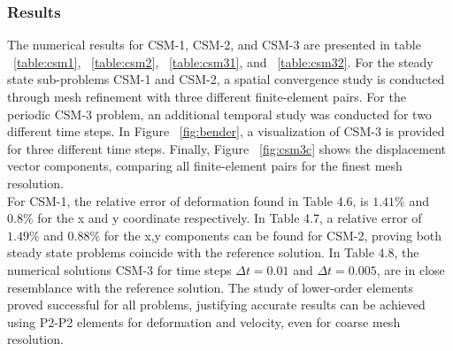 \subsubsection*{Results}
The numerical results for CSM-1, CSM-2, and CSM-3 are presented in table  ~\ref{table:csm1}, ~\ref{table:csm2}, ~\ref{table:csm31}, and ~\ref{table:csm32}. For the steady state sub-problems CSM-1 and CSM-2, a spatial convergence study is conducted through mesh refinement with three different finite-element pairs. For the periodic CSM-3 problem, an additional temporal study was conducted for two different time steps. In Figure ~\ref{fig:bender}, a visualization of CSM-3 is provided for three different time steps. Finally, Figure ~\ref{fig:csm3c} shows the displacement vector components, comparing all finite-element pairs for the finest mesh resolution. \\
 For CSM-1, the relative error of deformation found in Table 4.6, is $1.41 \%$ and $0.8\%$ for the x and y coordinate respectively. In Table 4.7, a relative error of   $1.49 \%$ and $0.88\%$ for the x,y components can be found for CSM-2, proving both steady state problems coincide with the reference solution. In Table 4.8, the numerical solutions CSM-3 for time steps $\Delta t = 0.01$ and $\Delta t = 0.005$, are in close resemblance with the reference solution. The study of lower-order elements proved successful for all problems, justifying accurate results can be achieved using P2-P2 elements for deformation and velocity, even for coarse mesh resolution. 
 
